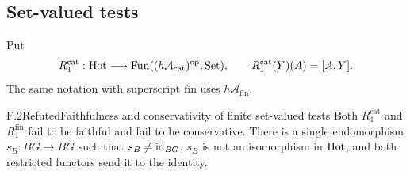 \subsection{Set-valued tests}

Put
\[
 R_1^{\mathrm{cat}}:\mathrm{Hot}\longrightarrow
 \operatorname{Fun}((h\mathcal A_{\mathrm{cat}})^{\mathrm{op}},\mathrm{Set}),
 \qquad R_1^{\mathrm{cat}}(Y)(A)=[A,Y].
\]
The same notation with superscript $\mathrm{fin}$ uses
$h\mathcal A_{\mathrm{fin}}$.

\begin{claim}{F.2}{Refuted}{Faithfulness and conservativity of finite set-valued tests}
Both $R_1^{\mathrm{cat}}$ and $R_1^{\mathrm{fin}}$ fail to be faithful
and fail to be conservative. There is a single endomorphism
$s_B:BG\to BG$ such that $s_B\ne\mathrm{id}_{BG}$, $s_B$ is not an isomorphism
in $\mathrm{Hot}$, and both restricted functors send it to the identity.
\end{claim}
